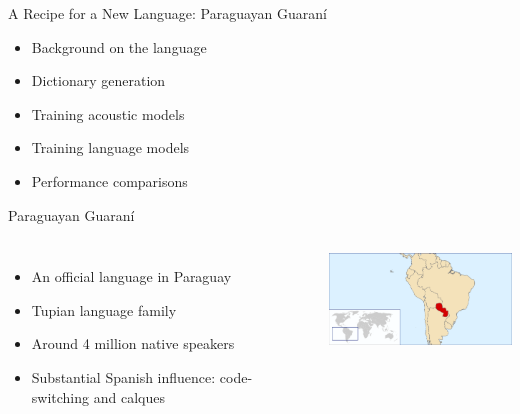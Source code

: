 \begin{frame}{A Recipe for a New Language: Paraguayan Guaran\'{i}}{}
  \begin{itemize}
    \item Background on the language
    \item Dictionary generation
    \item Training acoustic models
    \item Training language models
    \item Performance comparisons
  \end{itemize}
\end{frame}

\begin{frame}{Paraguayan Guaran\'{i}}{}
  \begin{columns}[c]
    \column{46mm}
    \begin{itemize}
    \item An official language in Paraguay
    \item Tupian language family
    \item Around 4 million native speakers
    \item Substantial Spanish influence: code-switching and calques
    \end{itemize}
    \column{62mm}
    \includegraphics[width=62mm]{figures/LocationParaguay}
  \end{columns}
  \vfill
\end{frame}

